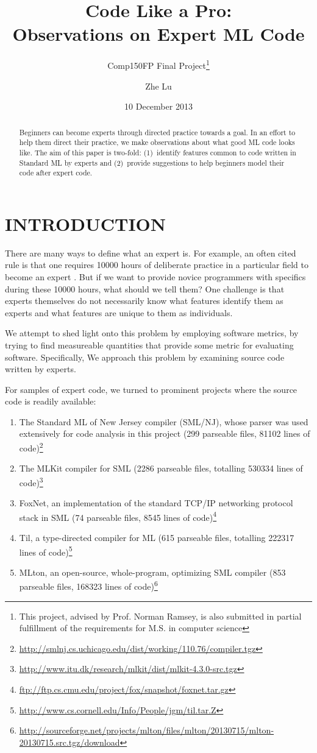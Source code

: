 \documentclass[12pt,abstracton]{scrartcl}
\title{Code Like a Pro:\\Observations on Expert ML Code}
\subtitle{Comp150FP Final Project\footnote{This project, advised by Prof. Norman Ramsey, is also submitted in partial fulfillment of the requirements for M.S. in computer science}}
\author{Zhe Lu}
\date{10 December 2013}
\begin{document}


\maketitle
\begin{abstract}
Beginners can become experts through directed practice towards a goal. In an effort to
help them direct their practice, we make observations about what good ML code looks like.
The aim of this paper is two-fold: (1)~identify features common to code written in Standard ML by experts and
(2)~provide suggestions to help beginners model their code after expert code.
\end{abstract}
\section{INTRODUCTION}
There are many ways to define what an expert is.
For example, an often cited rule is that one requires 10000 hours of deliberate practice
in a particular field to become an expert \cite{Gla08}. But if we want to provide novice programmers
with specifics during these 10000 hours, what should we tell them? One challenge is that experts themselves
do not necessarily know what features identify them as experts and what features are unique to them as individuals.

We attempt to shed light onto this problem by employing software metrics,
by trying to find measureable quantities
that provide some metric for evaluating software. Specifically,
We approach this problem by examining source code written by experts.

For samples of expert code, we turned to prominent projects where the source code is readily available:
\begin{enumerate}
\item The Standard ML of New Jersey compiler (SML/NJ), whose parser was used extensively for code analysis in this project (299 parseable files, 81102 lines of code)\footnote{\url{http://smlnj.cs.uchicago.edu/dist/working/110.76/compiler.tgz}}
\item The MLKit compiler for SML (2286 parseable files, totalling 530334 lines of code)\footnote{\url{http://www.itu.dk/research/mlkit/dist/mlkit-4.3.0-src.tgz}}
\item FoxNet, an implementation of the standard TCP/IP networking protocol stack in SML (74 parseable files, 8545 lines of code)\footnote{\url{ftp://ftp.cs.cmu.edu/project/fox/snapshot/foxnet.tar.gz}}
\item Til, a type-directed compiler for ML (615 parseable files, totalling 222317 lines of code)\footnote{\url{http://www.cs.cornell.edu/Info/People/jgm/til.tar.Z}}
\item MLton, an open-source, whole-program, optimizing SML compiler (853 parseable files, 168323 lines of code)\footnote{\url{http://sourceforge.net/projects/mlton/files/mlton/20130715/mlton-20130715.src.tgz/download}}
\end{enumerate}
\end{document}
